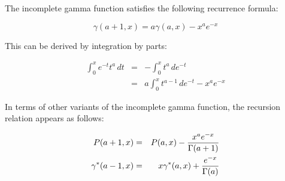 \documentclass[12pt]{article}
\begin{document}
The incomplete gamma function satisfies the following recurrence formula:

\[ \gamma (a+1,x) = a \gamma (a,x) - x^a e^{-x} \]

This can be derived by integration by parts:

\begin{eqnarray*}
\int_0^x e^{-t} t^a \, dt &=&
- \int_0^x t^a \, d e^{-t} \\
&=& a \int_0^x t^{a-1} \, d e^{-t} - x^a e^{-x}
\end{eqnarray*}

In terms of other variants of the incomplete gamma function, the recursion relation appears as follows:

\begin{eqnarray*}
P (a+1,x) &=& P (a,x) - {x^a e^{-x} \over \Gamma (a+1)} \\
\gamma^* (a-1,x) &=& x \gamma^* (a,x) + {e^{-x} \over \Gamma(a)} \\
\end{eqnarray*}
\end{document}
